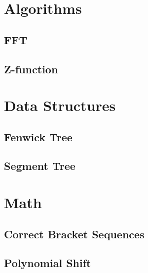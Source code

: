 \documentclass[12pt]{article}
\begin{document}
\tableofcontents

%
% 
%
% 

\section{Algorithms}

\subsection{FFT}


\subsection{Z-function}



\section{Data Structures}

\subsection{Fenwick Tree}


\subsection{Segment Tree}



\section{Math}

\subsection{Correct Bracket Sequences}


\subsection{Polynomial Shift}

\end{document}
